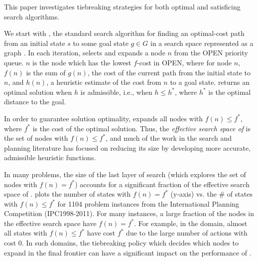 This paper investigates tiebreaking strategies for both optimal and
satisficing search algorithms.

We start with \astar, the standard search algorithm for finding an
optimal-cost path from an initial state $s$ to some goal state $g \in G$
in a search space represented as a graph \cite{hart1968formal}.  In each
iteration, \astar selects and expands a node $n$ from the OPEN priority
queue.  $n$ is the node which has the lowest $f$-cost in OPEN, where for
node $n$, $f(n)$ is the sum of $g(n)$, the cost of the current path from
the initial state to $n$, and $h(n)$, a heuristic estimate of the cost
from $n$ to a goal state.  \astar returns an optimal solution when $h$
is admissible, i.e., when $h \leq h^*$, where $h^*$ is the optimal
distance to the goal.

In order to guarantee solution optimality, \astar expands all nodes with
$f(n) \leq f^*$, where $f^*$ is the cost of the optimal solution.
Thus, the \emph{effective search space of \astar} is the set of nodes with 
$f(n) \leq f^*$, and
much of the work in the search and planning literature has focused
on reducing its size by
developing more accurate, admissible heuristic functions.

In many problems, the size of the
last layer of search (which explores the set of nodes with $f(n)=f^*$) accounts for a significant fraction of the effective search space of \astar.
 plots the number of states with $f(n) = f^*$ (y-axis)
vs. the \# of states with $f(n) \leq f^*$
for 1104 problem instances from the International Planning Competition (IPC1998-2011).
For many instances,  a large fraction of the nodes in the effective search space have
$f(n)=f^*$.
For example, in the  domain, almost all states with
$f(n) \leq f^*$ have cost $f^*$ due to the large number of actions with cost 0.
In such domains, the tiebreaking policy which decides which nodes to expand in the final frontier can have a significant impact on the performance of \astar.

